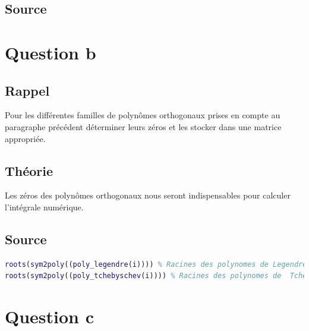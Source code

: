 \documentclass[a4paper,10pt]{report}
\begin{document}
\subsection*{Source}

\begin{center}
	
	
\end{center}

\section*{Question b}

\subsection*{Rappel}

Pour les différentes familles de polynômes orthogonaux prises en compte au paragraphe précédent déterminer leurs zéros et les stocker dans une matrice appropriée.

\subsection*{Théorie}

Les zéros des polynômes orthogonaux nous seront indispensables pour calculer l’intégrale numérique.

\subsection*{Source}

\begin{lstlisting}[language=Matlab]
roots(sym2poly((poly_legendre(i)))) % Racines des polynomes de Legendre
roots(sym2poly((poly_tchebyschev(i)))) % Racines des polynomes de  Tchebyschev
\end{lstlisting}

\section*{Question c}
\end{document}
